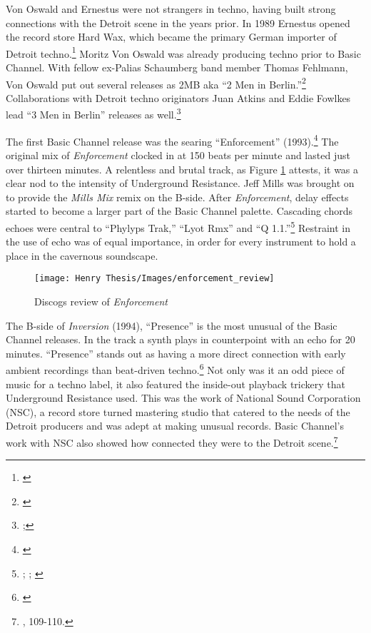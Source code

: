 \documentclass[12pt,twoside]{reedthesis}
\begin{document}
Von Oswald and Ernestus were not strangers in techno, having built strong connections with the Detroit scene in the years prior. In 1989 Ernestus opened the record store Hard Wax, which became the primary German importer of Detroit techno.\footnote{\cite{mcdermottLabelMonthBasic2018}} Moritz Von Oswald was already producing techno prior to Basic Channel. With fellow ex-Palias Schaumberg band member Thomas Fehlmann, Von Oswald put out several releases as 2MB aka ``2 Men in Berlin.''\footnote{\cite{2MB}} Collaborations with Detroit techno originators Juan Atkins and Eddie Fowlkes lead ``3 Men in Berlin'' releases as well.\footnote{\cite{3MB};\cite{fehlmannTimetable}}

The first Basic Channel release was the searing ``Enforcement'' (1993).\footnote{\cite{cyrusEnforcement1993}} The original mix of \emph{Enforcement} clocked in at 150 beats per minute and lasted just over thirteen minutes. A relentless and brutal track, as Figure \ref{fig:enforcement} attests, it was a clear nod to the intensity of Underground Resistance. Jeff Mills was brought on to provide the \emph{Mills Mix} remix on the B-side. After \emph{Enforcement}, delay effects started to become a larger part of the Basic Channel palette. Cascading chords echoes were central to ``Phylyps Trak,'' ``Lyot Rmx'' and ``Q 1.1.''\footnote{\cite{basicchannelPhylypsTrak1993}; \cite{basicchannelLyotRmx1993}; \cite{basicchannelQ111993}} Restraint in the use of echo was of equal importance, in order for every instrument to hold a place in the cavernous soundscape.

\begin{figure}[htbp]
\begin{centering} 
\texttt{[image: Henry Thesis/Images/enforcement\_review]}
\caption{Discogs review of \emph{Enforcement}}
\label{fig:enforcement}
\end{centering} 
\end{figure}

The B-side of \emph{Inversion} (1994), ``Presence'' is the most unusual of the Basic Channel releases. In the track a synth plays in counterpoint with an echo for 20 minutes. ``Presence'' stands out as having a more direct connection with early ambient recordings than beat-driven techno.\footnote{\cite{cyrusInversion1994}} Not only was it an odd piece of music for a techno label, it also featured the inside-out playback trickery that Underground Resistance used. This was the work of National Sound Corporation (NSC), a record store turned mastering studio that catered to the needs of the Detroit producers and was adept at making unusual records. Basic Channel's work with NSC also showed how connected they were to the Detroit scene.\footnote{\cite{sickoTechnoRebelsRenegades2010}, 109-110.}
\end{document}
